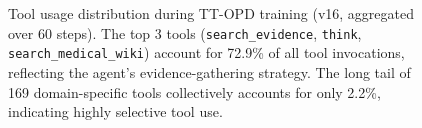 \begin{figure}[t]
\caption{Tool usage distribution during TT-OPD training (v16, aggregated over 60 steps). The top 3 tools (\texttt{search\_evidence}, \texttt{think}, \texttt{search\_medical\_wiki}) account for 72.9\% of all tool invocations, reflecting the agent's evidence-gathering strategy. The long tail of 169 domain-specific tools collectively accounts for only 2.2\%, indicating highly selective tool use.}
\label{fig:tool_usage}
\end{figure}


